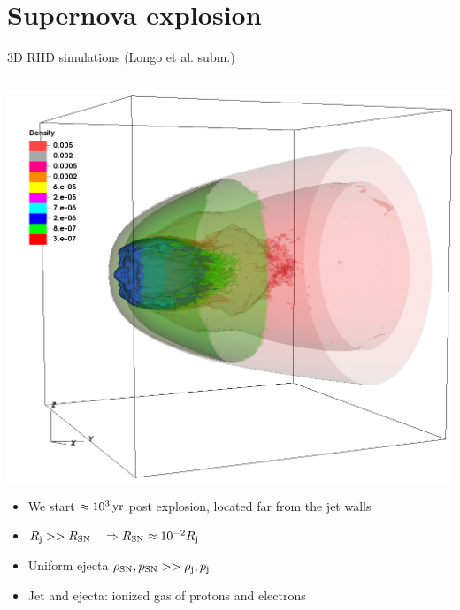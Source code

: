 \section{Supernova explosion}

\begin{frame}{3D RHD simulations (Longo et al. subm.)}
	\begin{columns}

		{\footnotesize
		\begin{column}{0.5\textwidth}
		\includegraphics[width=\textwidth]{images/3d_shot_rho.png}
				\vspace{-.5cm}
		 \begin{itemize}
		  \item We start $\approx 10^{3}\,{\rm yr}$ post explosion,
		 				located far from the jet walls
		  \item $R_{\rm j} >> R_{\rm SN}\quad \Rightarrow R_{\rm SN}\approx 10^{-2} R_{\rm j}$ \\
		  \item  Uniform ejecta $\rho_{\rm SN},p_{\rm SN}>>\rho_{\rm j},p_{\rm j}$
		  \item Jet and ejecta: ionized gas of protons and electrons
		 \end{itemize}


\end{column}}
\end{columns}
\end{frame}
